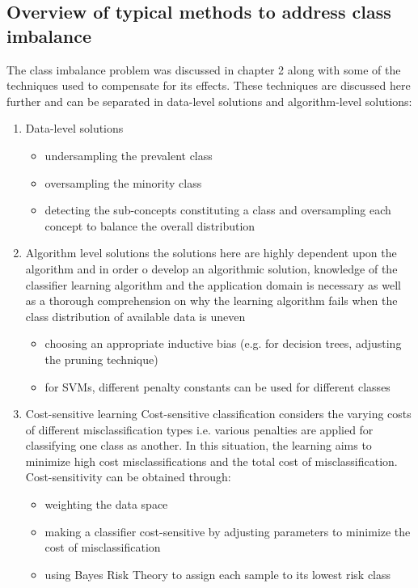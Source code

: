 \subsection{Overview of typical methods to address class imbalance}
The class imbalance problem was discussed in chapter 2 along with some of the techniques used to compensate for its effects. These techniques are discussed here further and can be separated in data-level solutions and algorithm-level solutions:
\begin{enumerate}
    \item Data-level solutions\citep{Sun:2013it}
    \begin{itemize}
        \item undersampling the prevalent class 
        \item oversampling the minority class
        \item detecting the sub-concepts constituting a class and  oversampling each concept to balance the overall distribution
    \end{itemize}
    \item Algorithm level solutions
    the solutions here are highly dependent upon the algorithm and in order o develop an algorithmic solution, knowledge of the classifier learning algorithm and the application domain is necessary as well as a thorough comprehension on why the learning algorithm fails when the class distribution of available data is uneven
    \begin{itemize}
        \item choosing an appropriate inductive bias (e.g. for decision trees, adjusting the pruning technique)
        \item for SVMs, different penalty constants can be used for different classes
    \end{itemize}
    \item Cost-sensitive learning\citep{Sun:2013it}
    Cost-sensitive classification considers the varying costs of different misclassification types i.e. various penalties are applied for classifying one class as another. In this situation, the learning aims to minimize high cost misclassifications and the total cost of misclassification.
    Cost-sensitivity can be obtained through:
    \begin{itemize}
        \item weighting the data space
        \item making a classifier cost-sensitive by adjusting parameters to minimize the cost of misclassification
        \item using Bayes Risk Theory to assign each sample to its lowest risk class
    \end{itemize}
\end{enumerate}
